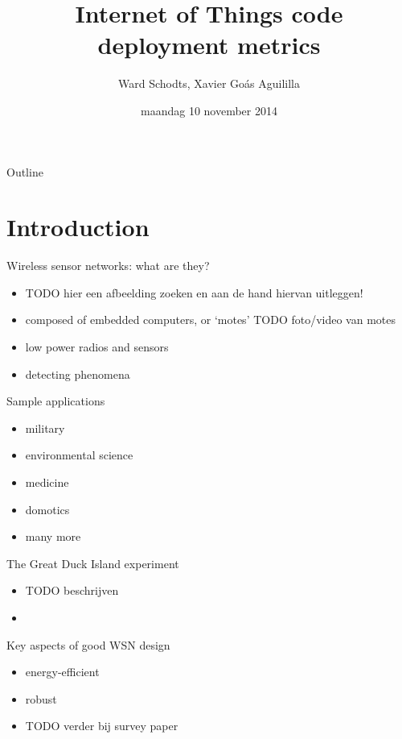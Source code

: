 \documentclass[presentation, bigger]{beamer}
\author{Ward Schodts, Xavier Goás Aguililla}
\date{maandag 10 november 2014}
\title{Internet of Things code deployment metrics}
\begin{document}
\maketitle
\begin{frame}{Outline}
\tableofcontents
\end{frame}


\section{Introduction}
\label{sec-1}
\begin{frame}[label=sec-1-1]{Wireless sensor networks: what are they?}
\begin{itemize}
\item TODO hier een afbeelding zoeken en aan de hand hiervan uitleggen!
\item composed of embedded computers, or ‘motes’
TODO foto/video van motes
\item low power radios and sensors
\item detecting phenomena
\end{itemize}
\end{frame}

\begin{frame}[label=sec-1-2]{Sample applications}
\begin{itemize}
\item military
\item environmental science
\item medicine
\item domotics
\item many more
\end{itemize}
\end{frame}

\begin{frame}[label=sec-1-3]{The Great Duck Island experiment}
\begin{itemize}
\item TODO beschrijven
\item 
\end{itemize}
\end{frame}

\begin{frame}[label=sec-1-4]{Key aspects of good WSN design}
\begin{itemize}
\item energy-efficient
\item robust
\item TODO verder bij survey paper
\end{itemize}
\end{frame}
\end{document}
